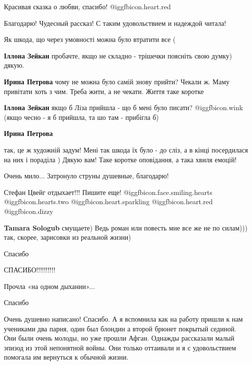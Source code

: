 \begin{itemize}
Красивая сказка о любви, спасибо! @igg{fbicon.heart.red}

Благодарю! Чудесный рассказ! С таким удовольствием и надеждой читала!

Як шкода, що через умовності можна було втратити все (

\begin{itemize} %
\textbf{Іллона Зейкан} пробачте, якщо не складно - трішечки поясніть свою думку) дякую.

\textbf{Ирина Петрова} чому не можна було самій знову прийти? Чекали ж. Маму привітати хоть з чим. Треба жити, а не чекати. Життя таке коротке

\textbf{Іллона Зейкан} якщо б Ліза прийшла - що б мені було писати? @igg{fbicon.wink}  (якщо чесно - я б прийшла, та шо там - прибігла б)

\textbf{Ирина Петрова} 

так, це ж художній задум! Мені так шкода їх було - до сліз, а в кінці
посердилася на них і пораділа ) Дякую вам! Таке коротке
оповідання, а така хвиля емоцій!

\end{itemize} %


Очень мило... Затронуло струны душевные, благодарю!


Стефан Цвейг отдыхает!!! Пишите еще! @igg{fbicon.face.smiling.hearts} @igg{fbicon.hearts.two}  @igg{fbicon.heart.sparkling} 
@igg{fbicon.heart.red} @igg{fbicon.dizzy} 

\begin{itemize} %
\textbf{Tamara Sologub} смущаете) Ведь роман или повесть мне все же не по силам))) так, скорее, зарисовки из реальной жизни)
\end{itemize} %

Спасибо

СПАСИБО!!!!!!!!!!

Прочла «на одном дыхании»...

Спасибо


Очень душевно написано! Спасибо. А я вспомнила как на работу пришли к нам
учениками два парня, один был блондин а второй брюнет покрытый сединой. Они были
очень молоды, но уже прошли Афган. Однажды рассказали малый эпизод из этой
непонятной войны. Они только оттаивали и я с удовольствием помогала им вернуться
к обычной жизни.


\end{itemize}
